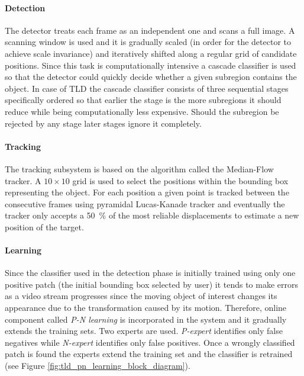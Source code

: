\paragraph{Detection} The detector treats each frame as an independent one and scans a full image. A scanning window is used and it is gradually scaled (in order for the detector to achieve scale invariance) and iteratively shifted along a regular grid of candidate positions. Since this task is computationally intensive a cascade classifier is used so that the detector could quickly decide whether a given subregion contains the object. In case of TLD the cascade classifier consists of three sequential stages specifically ordered so that earlier the stage is the more subregions it should reduce while being computationally less expensive. Should the subregion be rejected by any stage later stages ignore it completely.

\paragraph{Tracking} The tracking subsystem is based on the algorithm called the Median-Flow tracker. A $10 \times 10$ grid is used to select the positions within the bounding box representing the object. For each position a given point is tracked between the consecutive frames using pyramidal Lucas-Kanade tracker and eventually the tracker only accepts a 50~\% of the most reliable displacements to estimate a new position of the target.

\paragraph{Learning} Since the classifier used in the detection phase is initially trained using only one positive patch (the initial bounding box selected by user) it tends to make errors as a video stream progresses since the moving object of interest changes its appearance due to the transformation caused by its motion. Therefore, online component called \textit{P-N learning} is incorporated in the system and it gradually extends the training sets. Two experts are used. \textit{P-expert} identifies only false negatives while \textit{N-expert} identifies only false positives. Once a wrongly classified patch is found the experts extend the training set and the classifier is retrained (see Figure \ref{fig:tld_pn_learning_block_diagram}).

